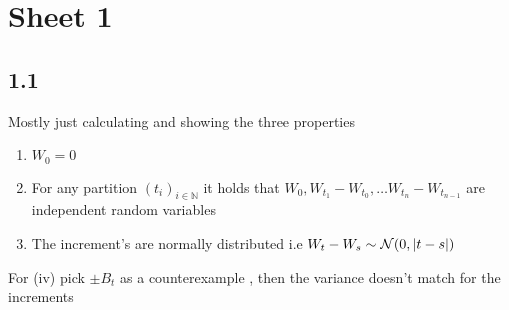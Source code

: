 \section*{Sheet 1}
\subsection*{1.1}
Mostly just calculating and showing the three properties 
\begin{enumerate}
 \item $W_0 = 0$
 \item For any partition $(t_i)_{i \in  \mathbb{N}}$ it holds that $W_0, W_{t_1} - W_{t_0},\ldots W_{t_n}-W_{t_{n-1}}$ are independent random variables
 \item The increment's are normally distributed i.e $W_t - W_s \sim \mathcal{N}(0,\lvert t-s\rvert)$
\end{enumerate}
For (iv) pick $\pm B_t$ as a counterexample , then the variance doesn't match for the increments
